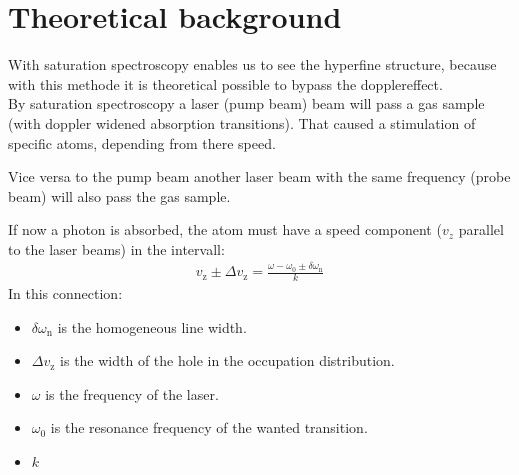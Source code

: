 \chapter{Theoretical background}

With saturation spectroscopy enables us to see the hyperfine structure, because with this methode it is theoretical possible to bypass the dopplereffect. \\
By saturation spectroscopy a laser (pump beam) beam will pass a gas sample (with doppler widened absorption transitions). That caused a stimulation of specific atoms, depending from there speed. 

Vice versa to the pump beam another laser beam with the same frequency (probe beam) will also pass the gas sample.

If now a photon is absorbed, the atom must have a speed component ($v_z$ parallel to the laser beams) in the intervall: 
\begin{align}
    v_{\text{z}} \pm \Delta v_{\text{z}} = \frac{\omega -\omega_0 \pm \delta \omega_{\text{n}}}{k}
\end{align}
In this connection: 
\begin{itemize} 
    \item $\delta \omega_{\text{n}}$ is the homogeneous line width.
    \item $\Delta v_{\text{z}}$ is the width of the hole in the occupation distribution.
    \item $\omega$ is the frequency of the laser.
    \item $\omega_0$ is the resonance frequency of the wanted transition.
    \item $k$ 
\end{itemize}